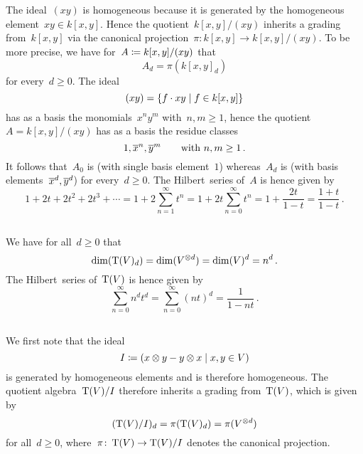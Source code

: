 \section{}





\subsection{}

The ideal~$(xy)$ is homogeneous because it is generated by the homogeneous element~$xy \in k[x,y]$.
Hence the quotient~$k[x,y]/(xy)$ inherits a grading from~$k[x,y]$ via the canonical projection~$\pi \colon k[x,y] \to k[x,y]/(xy)$.
To be more precise, we have for~$A \coloneqq k[x,y]/(xy)$ that
\[
    A_d
  = \pi(k[x,y]_d)
\]
for every~$d \geq 0$.
The ideal
\[
    (xy)
  = \{
      f \cdot xy
    \suchthat
      f \in k[x,y]
    \}
\]
has as a basis the monomials~$x^n y^m$ with~$n, m \geq 1$, hence the quotient~$A = k[x,y]/(xy)$ has as a basis the residue classes
\[
  1, \overline{x}^n, \overline{y}^m
  \qquad
  \text{with~$n, m \geq 1$} \,.
\]
It follows that~$A_0$ is  (with single basis element~$1$) whereas~$A_d$ is  (with basis elements~$\overline{x}^d, \overline{y}^d$) for every~$d \geq 0$.
The Hilbert~series of~$A$ is hence given by
\[
    1 + 2t + 2t^2 + 2t^3 + \dotsb
  = 1 + 2 \sum_{n=1}^\infty t^n
  = 1 + 2t \sum_{n=0}^\infty t^n
  = 1 + \frac{2t}{1-t}
  = \frac{1+t}{1-t} \,.
\]





\subsection{}

We have for all~$d \geq 0$ that
\[
    \dim(\operatorname{T}(V)_d)
  = \dim(V^{\otimes d})
  = \dim(V)^d
  = n^d \,.
\]
The Hilbert~series of~$\operatorname{T}(V)$ is hence given by
\[
    \sum_{n=0}^\infty n^d t^d
  = \sum_{n=0}^\infty (nt)^d
  = \frac{1}{1-nt} \,.
\]





\subsection{}

We first note that the {\twosided} ideal
\[
            I
  \defined  \genideal{
              x \tensor y - y \tensor x
            \suchthat
              x, y \in V
            }
\]
is generated by homogeneous elements and is therefore homogeneous.
The quotient algebra~$\operatorname{T}(V)/I$ therefore inherits a grading from~$\operatorname{T}(V)$, which is given by
\[
    ( \operatorname{T}(V)/I )_d
  = \pi( \operatorname{T}(V)_d )
  = \pi( V^{\otimes d} )
\]
for all~$d \geq 0$, where~$\pi \colon \operatorname{T}(V) \to \operatorname{T}(V)/I$ denotes the canonical projection.

